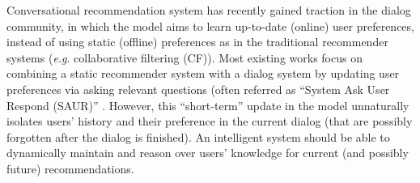 \documentclass[11pt,a4paper]{article}
\makeatletter
\DeclareRobustCommand\onedot{\futurelet\@let@token\@onedot}
\def\onedot{. }
\def\eg{\emph{e.g}\onedot} \def\Eg{\emph{E.g}\onedot}
\makeatother
\begin{document}
Conversational recommendation system has recently gained traction in the dialog community, in which the model aims to learn up-to-date (online) user preferences, instead of using static (offline) preferences as in the traditional recommender systems (\eg collaborative filtering (CF)).
Most existing works focus on combining a static recommender system with a dialog system by updating user preferences via asking relevant questions (often referred as ``System Ask User Respond (SAUR)'' \cite{zhang2018towards}.
However, this ``short-term'' update in the model unnaturally isolates users' history and their preference in the current dialog (that are possibly forgotten after the dialog is finished).
An intelligent system should be able to dynamically maintain and reason over users' knowledge for current (and possibly future) recommendations.
\end{document}
